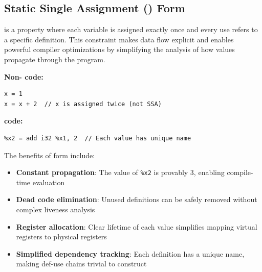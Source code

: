 \subsection{Static Single Assignment () Form}

 is a property where each variable is assigned exactly once and every use refers to a specific definition. This constraint makes data flow explicit and enables powerful compiler optimizations by simplifying the analysis of how values propagate through the program.

\textbf{Non- code:}
\begin{lstlisting}[style=ir]
x = 1
x = x + 2  // x is assigned twice (not SSA)
\end{lstlisting}

\textbf{ code:}
\begin{lstlisting}[style=ir]
%x1 = 1
%x2 = add i32 %x1, 2  // Each value has unique name
\end{lstlisting}

The benefits of  form include:
\begin{itemize}[noitemsep]
  \item \textbf{Constant propagation}: The value of \texttt{\%x2} is provably 3, enabling compile-time evaluation
  \item \textbf{Dead code elimination}: Unused definitions can be safely removed without complex liveness analysis
  \item \textbf{Register allocation}: Clear lifetime of each value simplifies mapping virtual registers to physical registers
  \item \textbf{Simplified dependency tracking}: Each definition has a unique name, making def-use chains trivial to construct
\end{itemize}
